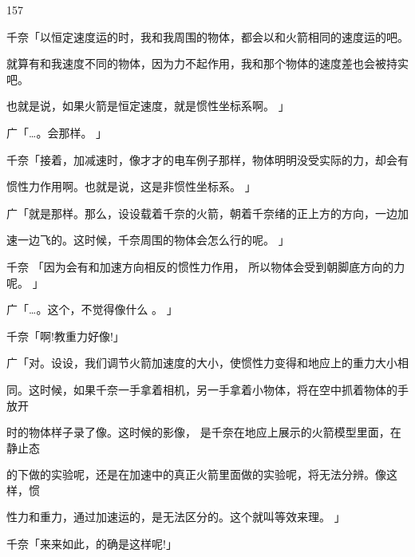 157\par
千奈「以恒定速度运的时，我和我周围的物体，都会以和火箭相同的速度运的吧。\par
就算有和我速度不同的物体，因为力不起作用，我和那个物体的速度差也会被持实吧。\par
也就是说，如果火箭是恒定速度，就是惯性坐标系啊。 」\par
广「…。会那样。 」\par
千奈「接着，加减速时，像才才的电车例子那样，物体明明没受实际的力，却会有\par
惯性力作用啊。也就是说，这是非惯性坐标系。 」\par
广「就是那样。那么，设设载着千奈的火箭，朝着千奈绪的正上方的方向，一边加\par
速一边飞的。这时候，千奈周围的物体会怎么行的呢。 」\par
千奈 「因为会有和加速方向相反的惯性力作用， 所以物体会受到朝脚底方向的力呢。 」\par
广「…。这个，不觉得像什么 。 」\par
千奈「啊!教重力好像!」\par
广「对。设设，我们调节火箭加速度的大小，使惯性力变得和地应上的重力大小相\par
同。这时候，如果千奈一手拿着相机，另一手拿着小物体，将在空中抓着物体的手放开\par
时的物体样子录了像。这时候的影像， 是千奈在地应上展示的火箭模型里面，在静止态\par
的下做的实验呢，还是在加速中的真正火箭里面做的实验呢，将无法分辨。像这样，惯\par
性力和重力，通过加速运的，是无法区分的。这个就叫等效来理。 」\par
千奈「来来如此，的确是这样呢!」\par

